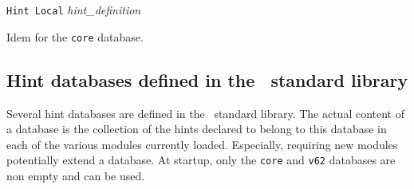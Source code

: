 \begin{coq_example*}
\begin{Variants}
\item\texttt{Hint Local} \textsl{hint\_definition}

  Idem for the {\tt core} database.

\end{Variants}






\subsection{Hint databases defined in the \Coq\ standard library}

Several hint databases are defined in the \Coq\ standard library.  The
actual content of a database is the collection of the hints declared
to belong to this database in each of the various modules currently
loaded.  Especially, requiring new modules potentially extend a
database. At {\Coq} startup, only the {\tt core} and {\tt v62}
databases are non empty and can be used.

\begin{description}


\end{description}
\end{coq_example*}
